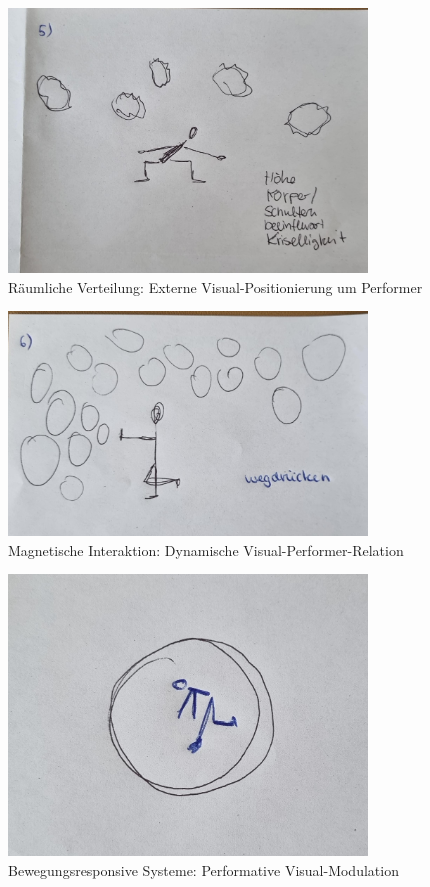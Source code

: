 \begin{figure}[H]
    \centering
    \includegraphics[width=0.85\textwidth]{images/Sprint3_2.jpg}
    \caption{Räumliche Verteilung: Externe Visual-Positionierung um Performer}
    \label{fig:external_positioning}
\end{figure}

\begin{figure}[H]
    \centering
    \includegraphics[width=0.85\textwidth]{images/Sprint3_3.jpg}
    \caption{Magnetische Interaktion: Dynamische Visual-Performer-Relation}
    \label{fig:magnetic_interaction}
\end{figure}

\begin{figure}[H]
    \centering
    \includegraphics[width=0.85\textwidth]{images/Sprint3_4.jpg}
    \caption{Bewegungsresponsive Systeme: Performative Visual-Modulation}
    \label{fig:movement_responsive}
\end{figure}

